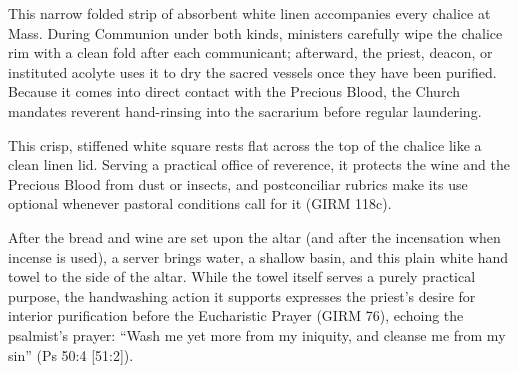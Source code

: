 \label{pc-obj-purificator}
This narrow folded strip of absorbent white linen accompanies every chalice at Mass. During Communion under both kinds, ministers carefully wipe the chalice rim with a clean fold after each communicant; afterward, the priest, deacon, or instituted acolyte uses it to dry the sacred vessels once they have been purified. Because it comes into direct contact with the Precious Blood, the Church mandates reverent hand-rinsing into the sacrarium before regular laundering.

\PCDEntryRule

\label{pc-obj-pall}
This crisp, stiffened white square rests flat across the top of the chalice like a clean linen lid. Serving a practical office of reverence, it protects the wine and the Precious Blood from dust or insects, and postconciliar rubrics make its use optional whenever pastoral conditions call for it (GIRM 118c).

\PCDEntryRule

\label{pc-obj-lavabo-towel}
After the bread and wine are set upon the altar (and after the incensation when incense is used), a server brings water, a shallow basin, and this plain white hand towel to the side of the altar. While the towel itself serves a purely practical purpose, the handwashing action it supports expresses the priest's desire for interior purification before the Eucharistic Prayer (GIRM 76), echoing the psalmist's prayer: ``Wash me yet more from my iniquity, and cleanse me from my sin'' (Ps 50:4 [51:2]).

